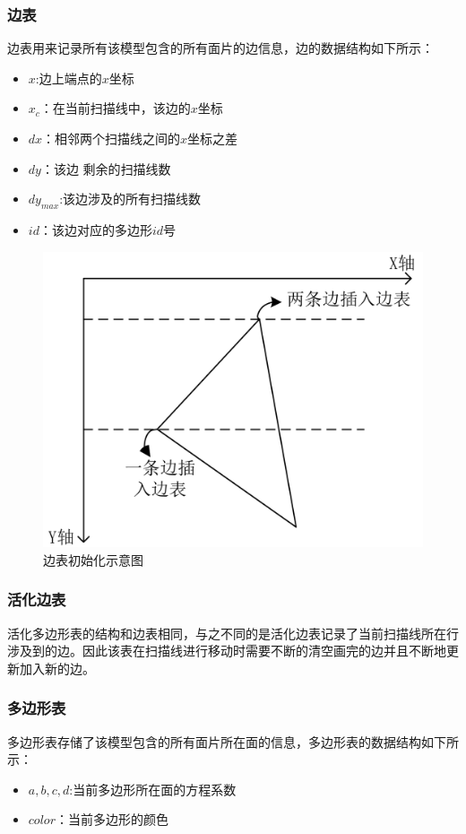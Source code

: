 \documentclass[10pt]{article}
\begin{document}
\subsubsection{边表}
边表用来记录所有该模型包含的所有面片的边信息，边的数据结构如下所示：
\begin{itemize}
\item{$x$:边上端点的$x$坐标}
\item{$x_c$：在当前扫描线中，该边的$x$坐标}
\item{$dx$：相邻两个扫描线之间的$x$坐标之差}
\item{$dy$：该边{\color{red} 剩余的}扫描线数}
\item{$dy_{max}$:该边涉及的所有扫描线数}
\item{$id$：该边对应的多边形$id$号}
\end{itemize}
\begin{figure}[H]
\setlength{\abovecaptionskip}{2pt}
\begin{center}
\includegraphics[scale=0.2]{structure1.png}
\caption{边表初始化示意图}
\end{center}
\end{figure}

\subsubsection{活化边表}
活化多边形表的结构和边表相同，与之不同的是活化边表记录了当前扫描线所在行涉及到的边。因此该表在扫描线进行移动时需要不断的清空画完的边并且不断地更新加入新的边。

\subsubsection{多边形表}
多边形表存储了该模型包含的所有面片所在面的信息，多边形表的数据结构如下所示：
\begin{itemize}
\item{$a,b,c,d$:当前多边形所在面的方程系数}
\item{$color$：当前多边形的颜色}
\end{itemize}
\end{document}
